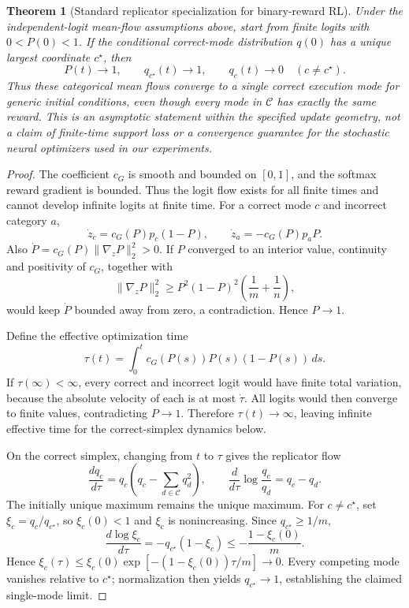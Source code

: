 \documentclass{article}
\newcommand{\1}{\mathbf 1}
\newtheorem{theorem}[lemma]{Theorem}
\theoremstyle{remark}
\theoremstyle{definition}
\theoremstyle{plain}
\begin{document}
\begin{theorem}[Standard replicator specialization for binary-reward RL]
\label{thm:grpo-collapse}
Under the independent-logit mean-flow assumptions above, start from finite
logits with $0<P(0)<1$. If the conditional correct-mode
distribution $q(0)$ has a unique largest coordinate $c^\star$, then
\[
  P(t)\longrightarrow1,
  \qquad
  q_{c^\star}(t)\longrightarrow1,
  \qquad
  q_c(t)\longrightarrow0\quad(c\ne c^\star).
\]
Thus these categorical mean flows converge to a single correct execution
mode for generic initial conditions, even though every mode in $\mathcal C$
has exactly the same reward. This is an asymptotic statement within the
specified update geometry, not a claim of finite-time support loss or a
convergence guarantee for the stochastic neural optimizers used in our experiments.
\end{theorem}

\begin{proof}
The coefficient $c_G$ is smooth and bounded on $[0,1]$, and the softmax
reward gradient is bounded. Thus the logit flow exists for all finite times
and cannot develop infinite logits at finite time.
For a correct mode $c$ and incorrect category $a$,
\[
  \dot z_c=c_G(P)p_c(1-P),
  \qquad
  \dot z_a=-c_G(P)p_aP.
\]
Also $\dot P=c_G(P)\lVert\nabla_zP\rVert_2^2>0$. If $P$ converged to an
interior value, continuity and positivity of $c_G$, together with
\[
 \lVert\nabla_zP\rVert_2^2
 \ge P^2(1-P)^2\left(\frac1m+\frac1n\right),
\]
would keep $\dot P$ bounded away from zero, a contradiction. Hence $P\to1$.

Define the effective optimization time
\[
  \tau(t)=\int_0^t c_G(P(s))P(s)(1-P(s))\,ds.
\]
If $\tau(\infty)<\infty$, every correct and incorrect logit would have finite
total variation, because the absolute velocity of each is at most $\dot\tau$.
All logits would then converge to finite values, contradicting $P\to1$.
Therefore $\tau(t)\to\infty$, leaving infinite effective time for the
correct-simplex dynamics below.

On the correct simplex, changing from $t$ to $\tau$ gives the replicator flow
\begin{equation}
  \frac{dq_c}{d\tau}
  =q_c\left(q_c-\sum_{d\in\mathcal C}q_d^2\right),
  \qquad
  \frac{d}{d\tau}\log\frac{q_c}{q_d}=q_c-q_d.
  \label{eq:grpo-replicator}
\end{equation}
The initially unique maximum remains the unique maximum. For $c\ne c^\star$,
set $\xi_c=q_c/q_{c^\star}$, so $\xi_c(0)<1$ and $\xi_c$ is nonincreasing.
Since $q_{c^\star}\ge1/m$,
\[
 \frac{d\log\xi_c}{d\tau}
 =-q_{c^\star}(1-\xi_c)
 \le-\frac{1-\xi_c(0)}{m}.
\]
Hence $\xi_c(\tau)\le\xi_c(0)\exp[-(1-\xi_c(0))\tau/m]\to0$.
Every competing mode vanishes relative to $c^\star$; normalization then
yields $q_{c^\star}\to1$, establishing the claimed single-mode limit.
\end{proof}
\end{document}
